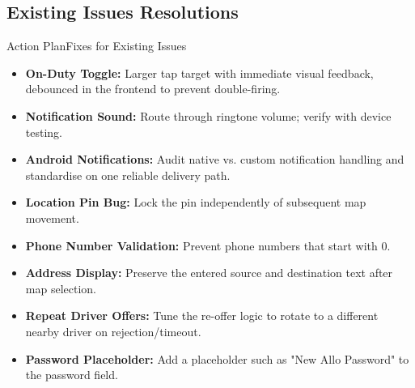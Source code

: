 \documentclass[11pt,a4paper]{article}
\begin{document}
\subsection{Existing Issues Resolutions}
\begin{recbox}{Action Plan}{Fixes for Existing Issues}
\begin{itemize}
  \item \textbf{On-Duty Toggle:} Larger tap target with immediate visual feedback, debounced in the frontend to prevent double-firing.
  \item \textbf{Notification Sound:} Route through ringtone volume; verify with device testing.
  \item \textbf{Android Notifications:} Audit native vs. custom notification handling and standardise on one reliable delivery path.
  \item \textbf{Location Pin Bug:} Lock the pin independently of subsequent map movement.
  \item \textbf{Phone Number Validation:} Prevent phone numbers that start with 0.
  \item \textbf{Address Display:} Preserve the entered source and destination text after map selection.
  \item \textbf{Repeat Driver Offers:} Tune the re-offer logic to rotate to a different nearby driver on rejection/timeout.
  \item \textbf{Password Placeholder:} Add a placeholder such as "New Allo Password" to the password field.
\end{itemize}
\end{recbox}
\end{document}

